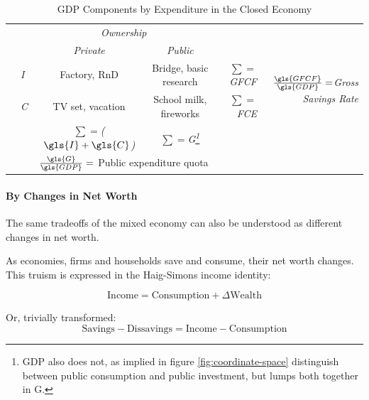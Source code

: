 \begin{landscape}%
\begin{table}
	\caption{GDP Components by Expenditure in the Closed Economy}
	\label{tab:GDPCompExp}
	\small
	\begin{center}
	\renewcommand{\arraystretch}{1.5}
	\begin{tabular}{llccrr}
		\toprule
		& & \multicolumn{2}{c}{\emph{Ownership}} & &\\
		\cmidrule(r){3-4}
		& &\emph{Private} & \emph{Public}& &\\
		\midrule
		\multirow{2}{*}{\emph{}} & \emph{\gls{I}} & Factory,  \gls{RnD} & Bridge, basic research & \emph{$\sum=$\gls{GFCF}} & \multirow{2}{*}{\emph{$\frac{\gls{GFCF}}{\gls{GDP}}=$Gross Savings Rate}}\\
		& \emph{\gls{C}} & TV set, vacation & School milk, fireworks & \emph{$\sum=$\gls{FCE}}  \\
		\midrule
		& &\emph{$\sum=$($\gls{I}+\gls{C}$)} & \emph{$\sum=$\gls{G}\footnote{\Gls{GDP} also does not, as implied in figure \ref{fig:coordinate-space} distinguish between public consumption and public investment, but lumps both together in \gls{G}.}}\\
		\cmidrule(r){3-4}
		& & \multicolumn{2}{c}{$\frac{\gls{G}}{\gls{GDP}}=$ Public expenditure quota} \\
		\bottomrule
	\end{tabular}
	\end{center}
\end{table}
\end{landscape}

\paragraph{By Changes in Net Worth}  \label{sec:deltanetworth} The same tradeoffs of the mixed economy can also be understood as different changes in net worth. 

As economies, firms and households save and consume, their net worth changes. This truism is expressed in the Haig-Simons income identity:

\begin{equation} \label{eq:haig-simons}
			\text{Income}=\text{Consumption}+\Delta\text{Wealth}
\end{equation}

Or, trivially transformed:
\begin{equation} \label{eq:haig-simonstradeoff}
			\text{Savings}-\text{Dissavings}=\text{Income}-\text{Consumption}
\end{equation}

